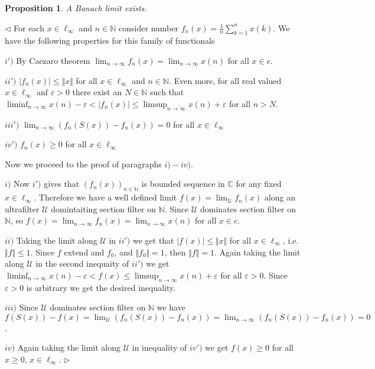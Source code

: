 \documentclass[12pt]{article}
\newtheorem{proposition}[theorem]{Proposition}
\newenvironment{proof}{\par $\triangleleft$}{$\triangleright$}
\begin{document}
\begin{proposition}\label{PrBanachLimitExists} A Banach limit exists.
\end{proposition}
\begin{proof} For each $x\in \ell_\infty$ and $n\in\mathbb{N}$ consider number $f_n(x)=\frac{1}{n}\sum_{k=1}^n x(k)$. We have the following properties for this family of functionals

$i')$ By Caezaro theorem $\lim_{n\to\infty} f_n(x)=\lim_{n\to\infty}x(n)$ for all $x\in c$. 

$ii')$ $|f_n(x)|\leq \Vert x\Vert$ for all $x\in\ell_\infty$ and $n\in\mathbb{N}$. Even more, for all real valued $x\in\ell_\infty$ anf $\varepsilon>0$ there exist an $N\in\mathbb{N}$ such that $\liminf_{n\to\infty} x(n)-\varepsilon<|f_n(x)|\leq\limsup_{n\to\infty}x(n)+\varepsilon$ for all $n>N$.

$iii')$ $\lim_{n\to\infty} (f_n(S(x))-f_n(x))=0$ for all $x\in\ell_\infty$

$iv')$ $f_n(x)\geq 0$ for all $x\in\ell_\infty$

Now we proceed to the proof of paragraphs $i)-iv)$.

$i)$ Now $i')$ gives that $(f_n(x))_{n\in\mathbb{N}}$ is bounded sequence in $\mathbb{C}$ for any fixed $x\in\ell_\infty$. Therefore we have a well defined limit $f(x)=\lim_{\mathcal{U}}f_n(x)$ along an ultrafilter $\mathcal{U}$ domintaiting section filter on $\mathbb{N}$. Since $\mathcal{U}$  dominates section filter on $\mathbb{N}$, so
$f(x)=\lim_{n\to\infty}f_n(x)=\lim_{n\to\infty} x(n)$ for all $x\in c$.  

$ii)$ Taking the limit along $\mathcal{U}$ in $ii')$ we get that $|f(x)|\leq\Vert x\Vert$ for all $x\in\ell_\infty$, i.e. $\Vert f\Vert\leq 1$. Since $f$ extend and $f_0$, and $\Vert f_0\Vert=1$, then $\Vert f\Vert=1$. Again taking the limit along $\mathcal{U}$ in the second inequaity of $ii')$ we get $\liminf_{n\to\infty} x(n)-\varepsilon< f(x) \leq\limsup_{n\to\infty}x(n)+\varepsilon$ for all $\varepsilon>0$. Since $\varepsilon>0$ is arbitrary we get the desired inequality.

$iii)$ Since $\mathcal{U}$ dominates section filter on $\mathbb{N}$ we have
$f(S(x))-f(x)=\lim_{\mathcal{U}}(f_n(S(x))-f_n(x))=\lim_{n\to\infty}(f_n(S(x))-f_n(x))=0$. 

$iv)$ Again taking the limit along $\mathcal{U}$ in inequality of $iv')$ we get $f(x)\geq 0$ for all $x\geq 0$, $x\in\ell_\infty$.
\end{proof}
\end{document}

